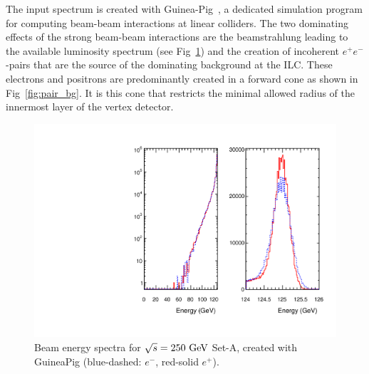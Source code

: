 The input spectrum is created with Guinea-Pig~\cite{Schulte:1998au}, a dedicated simulation program for computing
beam-beam interactions at linear colliders. The two dominating effects of the strong beam-beam interactions are the 
beamstrahlung leading to the available luminosity spectrum (see Fig~\ref{fig:lumi_spectrum}) and the creation of
incoherent $e^+e^-$-pairs that are the source of the dominating background at the ILC. These electrons and positrons
are predominantly created in a forward cone as shown in Fig~\ref{fig:pair_bg}. It is this cone that restricts the minimal
allowed radius of the innermost layer of the vertex detector.

\begin{figure}
\begin{center}
\includegraphics[width=1.\hsize]{chapters/figures/beam_spectrum_gp_250Gev_SetA.pdf}
\end{center}
\caption{Beam energy spectra for $\sqrt{s}=250~\rm{GeV}$ Set-A, created with GuineaPig (blue-dashed: $e^-$, red-solid $e^+$).}
\label{fig:lumi_spectrum}
\end{figure}

